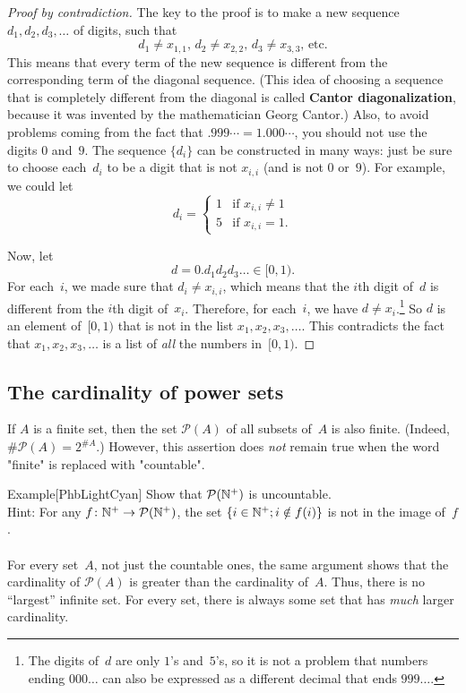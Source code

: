 \documentclass[../MATH-2000-Notes.tex]{subfiles}
\begin{document}
\begin{proof}[Proof by contradiction]
    The key to the proof is to make a new sequence $d_1,d_2,d_3,\ldots$ of digits, such that 
        $$ \text{$d_1 \neq x_{1,1}$, \ $d_2 \neq x_{2,2}$, \ $d_3 \neq x_{3,3}$, \ etc.} $$
    This means that every term of the new sequence is different from the corresponding term of the diagonal sequence. (This idea of choosing a sequence that is completely different from the diagonal is called \textbf{Cantor diagonalization}, because it was invented by the mathematician Georg Cantor.) Also, to avoid problems coming from the fact that $.999\cdots = 1.000\cdots$, you should not use the digits $0$ and~$9$. The sequence $\{d_i\}$ can be constructed in many ways: just be sure to choose each~$d_i$ to be a digit that is not $x_{i,i}$ (and is not $0$ or~$9$).  For example, we could let
        $$ d_i = \begin{cases} 1 & \text{if $x_{i,i} \neq 1$} \\ 5 & \text{if $x_{i,i} = 1$} . \end{cases} $$
    
    Now, let 
        $$d = 0.d_1d_2d_3\ldots \in [0,1) .$$
    For each~$i$, we made sure that $d_i \neq x_{i,i}$, which means that the $i$th digit of~$d$ is different from the $i$th digit of~$x_i$. Therefore, for each~$i$, we have $d \neq x_i$\rlap.\footnote{The digits of~$d$ are only $1$'s and~$5$'s, so it is not a problem that numbers ending $000\ldots$ can also be expressed as a different decimal that ends $999\ldots$.} So $d$ is an element of~$[0,1)$ that is not in the list $x_1,x_2,x_3,\ldots$. This contradicts the fact that $x_1,x_2,x_3,\ldots$ is a list of \emph{all} the numbers in~$[0,1)$.
\end{proof}
\subsection{The cardinality of power sets}
If $A$ is a finite set, then the set $\mathcal{P}(A)$ of all subsets of~$A$ is also finite. (Indeed, $\#\mathcal{P}(A) = 2^{\#A}$.) However, this assertion does \emph{not} remain true when the word "finite" is replaced with "countable".
\begin{commentbox}{Example}[{PhbLightCyan}]
    \label{P(N)UncountEx}
    Show that $\mathcal{P}(\mathbb{N}^+)$ is uncountable.
    \\Hint: For any $f \colon \mathbb{N}^+ \to \mathcal{P}(\mathbb{N}^+)$, the set $\{i \in \mathbb{N}^+; i \notin f(i)\}$ is not in the image of~$f$.
    \\~\\
    For every set~$A$, not just the countable ones, the same argument shows that the cardinality of $\mathcal{P}(A)$ is greater than the cardinality of~$A$. Thus, there is no ``largest'' infinite set. For every set, there is always some set that has \emph{much} larger cardinality.
\end{commentbox}
\end{document}
